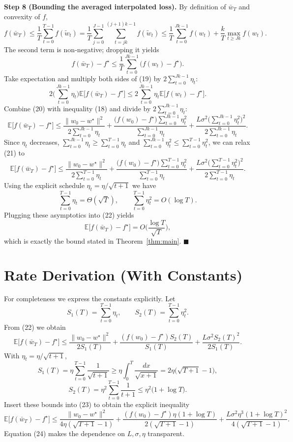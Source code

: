 \documentclass{article}
\newcommand{\E}{\mathbb{E}}
\begin{document}
\noindent\textbf{Step 8 (Bounding the averaged interpolated loss).}  
By definition of $\bar w_T$ and convexity of $f$,
\[
f(\bar w_T)\le \frac1T\sum_{t=0}^{T-1}f(\tilde w_t)
            =\frac1T\sum_{j=0}^{J-1}\sum_{t=jk}^{(j+1)k-1}f(\tilde w_t)
            \le\frac1T\sum_{t=0}^{Jk-1}f(w_t) +\frac{k}{T}\max_{t\ge Jk}f(w_t).
\]
The second term is non‑negative; dropping it yields
\[
f(\bar w_T)-f^\star\le\frac1T\sum_{t=0}^{Jk-1}\big(f(w_t)-f^\star\big).
\tag{19}
\]
Take expectation and multiply both sides of (19) by $2\sum_{t=0}^{Jk-1}\eta_t$:
\[
2\Big(\sum_{t=0}^{Jk-1}\eta_t\Big)\E\!\big[f(\bar w_T)-f^\star\big]
\le 2\sum_{t=0}^{Jk-1}\eta_t\E\!\big[f(w_t)-f^\star\big].
\tag{20}
\]
Combine (20) with inequality (18) and divide by $2\sum_{t=0}^{Jk-1}\eta_t$:
\[
\E\!\big[f(\bar w_T)-f^\star\big]
\le
\frac{\|w_0-w^\star\|^2}{2\sum_{t=0}^{Jk-1}\eta_t}
+\frac{ \big(f(w_0)-f^\star\big)\sum_{t=0}^{Jk-1}\eta_t^2}{\sum_{t=0}^{Jk-1}\eta_t}
+\frac{L\sigma^2\big(\sum_{t=0}^{Jk-1}\eta_t^2\big)^2}{2\sum_{t=0}^{Jk-1}\eta_t}.
\tag{21}
\]
Since $\eta_t$ decreases, $\sum_{t=0}^{Jk-1}\eta_t\ge \sum_{t=0}^{T-1}\eta_t$ and $\sum_{t=0}^{Jk-1}\eta_t^2\le \sum_{t=0}^{T-1}\eta_t^2$, we can relax (21) to
\[
\E\!\big[f(\bar w_T)-f^\star\big]
\le
\frac{\|w_0-w^\star\|^2}{2\sum_{t=0}^{T-1}\eta_t}
+\frac{ \big(f(w_0)-f^\star\big)\sum_{t=0}^{T-1}\eta_t^2}{\sum_{t=0}^{T-1}\eta_t}
+\frac{L\sigma^2\big(\sum_{t=0}^{T-1}\eta_t^2\big)^2}{2\sum_{t=0}^{T-1}\eta_t}.
\tag{22}
\]
Using the explicit schedule $\eta_t=\eta/\sqrt{t+1}$ we have
\[
\sum_{t=0}^{T-1}\eta_t = \Theta(\sqrt{T}),\qquad
\sum_{t=0}^{T-1}\eta_t^2 = O(\log T).
\]
Plugging these asymptotics into (22) yields
\[
\E\!\big[f(\bar w_T)-f^\star\big]= O\!\Big(\frac{\log T}{\sqrt{T}}\Big),
\]
which is exactly the bound stated in Theorem~\ref{thm:main}. \hfill $\blacksquare$

\section*{Rate Derivation (With Constants)}
For completeness we express the constants explicitly. Let
\[
S_1(T)=\sum_{t=0}^{T-1}\eta_t,\qquad
S_2(T)=\sum_{t=0}^{T-1}\eta_t^2 .
\]
From (22) we obtain
\[
\E\!\big[f(\bar w_T)-f^\star\big]
\le
\frac{\|w_0-w^\star\|^2}{2S_1(T)}
+\frac{(f(w_0)-f^\star)S_2(T)}{S_1(T)}
+\frac{L\sigma^2 S_2(T)^2}{2S_1(T)} .
\tag{23}
\]
With $\eta_t=\eta/\sqrt{t+1}$,
\[
S_1(T)=\eta\sum_{t=0}^{T-1}\frac1{\sqrt{t+1}}
      \ge \eta\int_{0}^{T}\frac{dx}{\sqrt{x+1}}
      =2\eta\big(\sqrt{T+1}-1\big),
\]
\[
S_2(T)=\eta^2\sum_{t=0}^{T-1}\frac1{t+1}
      \le \eta^2\big(1+\log T\big).
\]
Insert these bounds into (23) to obtain the explicit inequality
\[
\E\!\big[f(\bar w_T)-f^\star\big]
\le
\frac{\|w_0-w^\star\|^2}{4\eta(\sqrt{T+1}-1)}
+\frac{(f(w_0)-f^\star)\eta(1+\log T)}{2(\sqrt{T+1}-1)}
+\frac{L\sigma^2\eta^3(1+\log T)^2}{4(\sqrt{T+1}-1)} .
\tag{24}
\]
Equation (24) makes the dependence on $L,\sigma,\eta$ transparent.
\end{document}
